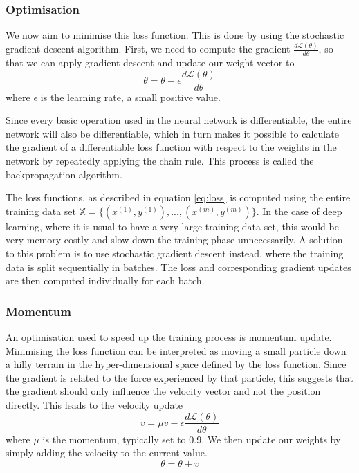 \documentclass[12pt,a4paper,twoside,openright]{report}
\begin{document}
\subsubsection{Optimisation}
We now aim to minimise this loss function. This is done by using the stochastic gradient descent algorithm. First, we need to compute the gradient $\frac{d\mathcal{L}(\theta)}{d\theta}$, so that we can apply gradient descent and update our weight vector to
\begin{equation}
	\theta = \theta - \epsilon \frac{d\mathcal{L}(\theta)}{d\theta}
\end{equation}
where $\epsilon$ is the learning rate, a small positive value.

Since every basic operation used in the neural network is differentiable, the entire network will also be differentiable, which in turn makes it possible to calculate the gradient of a differentiable loss function with respect to the weights in the network by repeatedly applying the chain rule. This process is called the backpropagation algorithm.

The loss functions, as described in equation \ref{eq:loss} is computed using the entire training data set $\mathbb{X} = \{(x^{(1)},y^{(1)}), ...,(x^{(m)},y^{(m)})\}$. In the case of deep learning, where it is usual to have a very large training data set, this would be very memory costly and slow down the training phase unnecessarily. A solution to this problem is to use stochastic gradient descent instead, where the training data is split sequentially in batches. The loss and corresponding gradient updates are then computed individually for each batch.

\subsubsection{Momentum}
An optimisation used to speed up the training process is momentum update. Minimising the loss function can be interpreted as moving a small particle down a hilly terrain in the hyper-dimensional space defined by the loss function. Since the gradient is related to the force experienced by that particle, this suggests that the gradient should only influence the velocity vector and not the position directly. This leads to the velocity update
\begin{equation}
	v = \mu  v - \epsilon \frac{d\mathcal{L}(\theta)}{d\theta}
\end{equation}
where $\mu$ is the momentum, typically set to 0.9. We then update our weights by simply adding the velocity to the current value.
\begin{equation}
	\theta = \theta + v
\end{equation}
\end{document}
